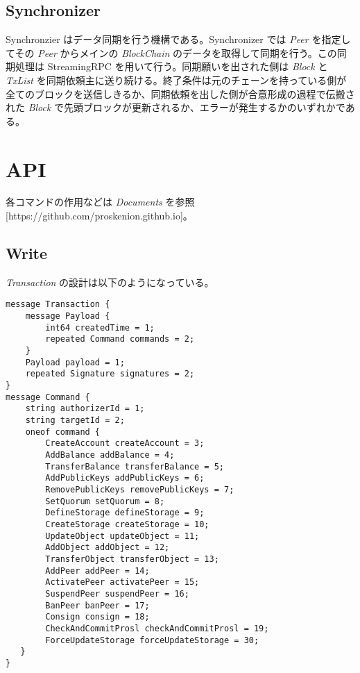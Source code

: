 \hypertarget{synchronizer}{%
\subsection{Synchronizer}\label{synchronizer}}

Synchronzier はデータ同期を行う機構である。Synchronizer では \emph{Peer}
を指定してその \emph{Peer} からメインの \emph{BlockChain}
のデータを取得して同期を行う。この同期処理は StreamingRPC
を用いて行う。同期願いを出された側は \emph{Block} と \emph{TxList}
を同期依頼主に送り続ける。終了条件は元のチェーンを持っている側が全てのブロックを送信しきるか、同期依頼を出した側が合意形成の過程で伝搬された
\emph{Block}
で先頭ブロックが更新されるか、エラーが発生するかのいずれかである。

\hypertarget{api}{%
\section{API}\label{api}}

各コマンドの作用などは \emph{Documents}
を参照{[}https://github.com/proskenion.github.io{]}。

\hypertarget{write}{%
\subsection{Write}\label{write}}

\emph{Transaction} の設計は以下のようになっている。

\begin{verbatim}
message Transaction {
    message Payload {
        int64 createdTime = 1;
        repeated Command commands = 2;
    }
    Payload payload = 1;
    repeated Signature signatures = 2;
}
message Command {
    string authorizerId = 1;
    string targetId = 2;
    oneof command {
        CreateAccount createAccount = 3;
        AddBalance addBalance = 4;
        TransferBalance transferBalance = 5;
        AddPublicKeys addPublicKeys = 6;
        RemovePublicKeys removePublicKeys = 7;
        SetQuorum setQuorum = 8;
        DefineStorage defineStorage = 9;
        CreateStorage createStorage = 10;
        UpdateObject updateObject = 11;
        AddObject addObject = 12;
        TransferObject transferObject = 13;
        AddPeer addPeer = 14;
        ActivatePeer activatePeer = 15;
        SuspendPeer suspendPeer = 16;
        BanPeer banPeer = 17;
        Consign consign = 18;
        CheckAndCommitProsl checkAndCommitProsl = 19;
        ForceUpdateStorage forceUpdateStorage = 30;
   }
}
\end{verbatim}

